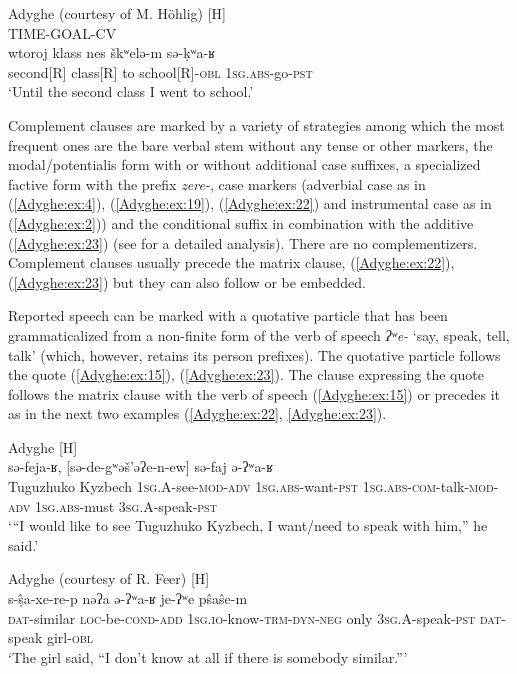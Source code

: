 \documentclass[output=paper,colorlinks,citecolor=brown, draft]{langscibook}
\begin{document}
\ea\label{Adyghe:ex:20}
Adyghe (courtesy of M. Höhlig) [H] \\
TIME-GOAL-CV \\
\gll wtoroj klass nes škʷelə-m sə-ḳʷa-ʁ \\
second[R] class[R] to school[R]\textsc{-obl} \textsc{1sg.}\textsc{abs-}go\textsc{-pst} \\
\glt `Until the second class I went to school.' 
\z

Complement clauses are marked by a variety of strategies among which the most frequent ones are the bare verbal stem without any tense or other markers, the modal/potentialis form with or without additional case suffixes, a specialized factive form with the prefix \textit{zere-}, case markers (adverbial case as in (\ref{Adyghe:ex:4}), (\ref{Adyghe:ex:19}), (\ref{Adyghe:ex:22}) and instrumental case as in (\ref{Adyghe:ex:2})) and the conditional suffix in combination with the additive (\ref{Adyghe:ex:23}) (see \citealt{serdobolskaya2016semantics} for a detailed analysis). There are no complementizers. Complement clauses usually precede the matrix clause, (\ref{Adyghe:ex:22}), (\ref{Adyghe:ex:23}) but they can also follow or be embedded.

Reported speech can be marked with a quotative particle that has been grammaticalized from a non-finite form of the verb of speech \textit{ʔʷe-} `say, speak, tell, talk' (which, however, retains its person prefixes). The quotative particle follows the quote (\ref{Adyghe:ex:15}), (\ref{Adyghe:ex:23}). The clause expressing the quote follows the matrix clause with the verb of speech (\ref{Adyghe:ex:15}) or precedes it as in the next two examples (\ref{Adyghe:ex:22}, \ref{Adyghe:ex:23}). 

\ea\label{Adyghe:ex:22}
Adyghe \citep{feer2019grammar} [H] \\
 sə-feja-ʁ, [sə-de-gʷəš'əʔe-n-ew] sə-faj ə-ʔʷa-ʁ \\
Tuguzhuko Kyzbech \textsc{1sg.A-}see\textsc{-mod}\textsc{-adv} \textsc{1sg.}\textsc{abs-}want\textsc{-pst} \textsc{1sg.}\textsc{abs-}\textsc{com-}talk\textsc{-mod}\textsc{-adv} \textsc{1sg.}\textsc{abs-}must \textsc{3sg.A-}speak\textsc{-pst} \\
\glt `{}``I would like to see Tuguzhuko Kyzbech, I want/need to speak with him,'' he said.'
\z

\ea\label{Adyghe:ex:23}
Adyghe (courtesy of R. Feer) [H] \\
\gll [a-fede š'ə-ʔe-m-jə] s-ṣ̂a-xe-re-p nəʔa  ə-ʔʷa-ʁ je-ʔʷe pŝaŝe-m \\
\textsc{dat-}similar \textsc{loc-}be\textsc{-cond}\textsc{-add} \textsc{1sg.}\textsc{io-}know\textsc{-trm}\textsc{-dyn}\textsc{-neg} only \textsc{3sg.A-}speak\textsc{-pst} \textsc{dat-}speak girl\textsc{-obl} \\
\glt `The girl said, ``I don't know at all if there is somebody similar.'''
\z
\end{document}
